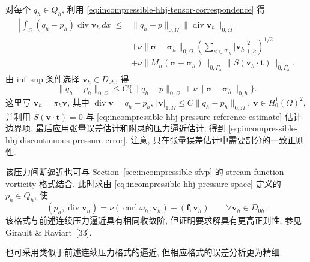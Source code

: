 \begin{Proof}
对每个 $q_h\in Q_h$, 利用
\eqref{eq:incompressible-hhj-tensor-correspondence} 得
\[
\begin{split}
\left|\int_\Omega(q_h-p_h)\operatorname{div}\mathbf v_h\,dx\right|
\leq{}&\|q_h-p\|_{0,\Omega}\|\operatorname{div}\mathbf v_h\|_{0,\Omega}\\
&+\nu\|\boldsymbol\sigma-\boldsymbol\sigma_h\|_{0,\Omega}
\left(\sum_{\kappa\in\mathcal T_h}|\mathbf v_h|_{1,\kappa}^2\right)^{1/2}\\
&+\nu\|M_n(\boldsymbol\sigma-\boldsymbol\sigma_h)\|_{0,\Gamma_h}
\|S(\mathbf v_h\cdot\mathbf t)\|_{0,\Gamma_h}.
\end{split}
\]
由 inf--sup 条件选择 $\mathbf v_h\in D_{0h}$, 得
\[
\|q_h-p_h\|_{0,\Omega}
\leq C\{\|q_h-p\|_{0,\Omega}
+\nu\|\boldsymbol\sigma-\boldsymbol\sigma_h\|_{0,h}\}.
\]
这里写 $\mathbf v_h=\pi_h\mathbf v$, 其中
$\operatorname{div}\mathbf v=q_h-p_h$,
$|\mathbf v|_{1,\Omega}\leq C\|q_h-p_h\|_{0,\Omega}$,
$\mathbf v\in H_0^1(\Omega)^2$, 并利用
$S(\mathbf v\cdot\mathbf t)=0$ 与
\eqref{eq:incompressible-hhj-pressure-reference-estimate}
估计边界项. 最后应用张量误差估计和附录的压力逼近估计,
得到 \eqref{eq:incompressible-hhj-discontinuous-pressure-error}.
注意, 只在张量误差估计中需要剖分的一致正则性.
\end{Proof}

\begin{Remark}\label{rem:incompressible-hhj-pressure-with-vorticity-scheme}
该压力间断逼近也可与 Section~\ref{sec:incompressible-sfvp}
的 stream function--vorticity 格式结合. 此时求由
\eqref{eq:incompressible-hhj-pressure-space} 定义的 $p_h\in Q_h$, 使
\begin{equation}\label{eq:incompressible-vorticity-discontinuous-pressure}
(p_h,\operatorname{div}\mathbf v_h)
=\nu(\operatorname{curl}\omega_h,\mathbf v_h)
-(\mathbf f,\mathbf v_h)
\qquad\forall\mathbf v_h\in D_{0h}.
\end{equation}
该格式与前述连续压力逼近具有相同收敛阶,
但证明要求解具有更高正则性, 参见 Girault \& Raviart~[33].
\end{Remark}

\begin{Remark}\label{rem:incompressible-hhj-continuous-pressure-alternative}
也可采用类似于前述连续压力格式的逼近,
但相应格式的误差分析更为精细.
\end{Remark}

